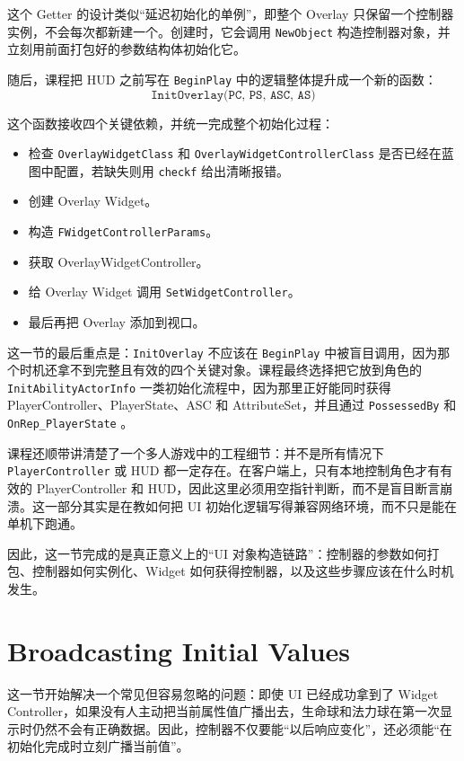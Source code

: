 这个 Getter 的设计类似“延迟初始化的单例”，即整个 Overlay 只保留一个控制器实例，不会每次都新建一个。创建时，它会调用 \texttt{NewObject} 构造控制器对象，并立刻用前面打包好的参数结构体初始化它。

随后，课程把 HUD 之前写在 \texttt{BeginPlay} 中的逻辑整体提升成一个新的函数：
\[
\texttt{InitOverlay(PC, PS, ASC, AS)}
\]

这个函数接收四个关键依赖，并统一完成整个初始化过程：
\begin{itemize}
	\item 检查 \texttt{OverlayWidgetClass} 和 \texttt{OverlayWidgetControllerClass} 是否已经在蓝图中配置，若缺失则用 \texttt{checkf} 给出清晰报错。
	\item 创建 Overlay Widget。
	\item 构造 \texttt{FWidgetControllerParams}。
	\item 获取 OverlayWidgetController。
	\item 给 Overlay Widget 调用 \texttt{SetWidgetController}。
	\item 最后再把 Overlay 添加到视口。
\end{itemize}

这一节的最后重点是：\texttt{InitOverlay} 不应该在 \texttt{BeginPlay} 中被盲目调用，因为那个时机还拿不到完整且有效的四个关键对象。课程最终选择把它放到角色的 \texttt{InitAbilityActorInfo} 一类初始化流程中，因为那里正好能同时获得 PlayerController、PlayerState、ASC 和 AttributeSet，并且通过 \texttt{PossessedBy} 和 \texttt{OnRep\_PlayerState} 。

课程还顺带讲清楚了一个多人游戏中的工程细节：并不是所有情况下 \texttt{PlayerController} 或 HUD 都一定存在。在客户端上，只有本地控制角色才有有效的 PlayerController 和 HUD，因此这里必须用空指针判断，而不是盲目断言崩溃。这一部分其实是在教如何把 UI 初始化逻辑写得兼容网络环境，而不只是能在单机下跑通。

因此，这一节完成的是真正意义上的“UI 对象构造链路”：控制器的参数如何打包、控制器如何实例化、Widget 如何获得控制器，以及这些步骤应该在什么时机发生。

\section{Broadcasting Initial Values}

这一节开始解决一个常见但容易忽略的问题：即使 UI 已经成功拿到了 Widget Controller，如果没有人主动把当前属性值广播出去，生命球和法力球在第一次显示时仍然不会有正确数据。因此，控制器不仅要能“以后响应变化”，还必须能“在初始化完成时立刻广播当前值”。

